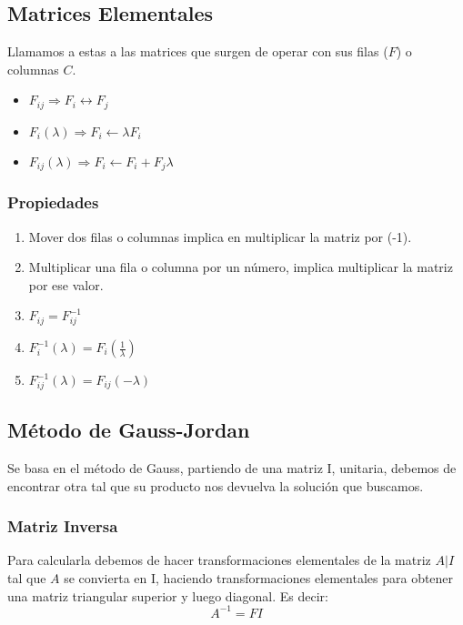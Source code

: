 \subsection{Matrices Elementales}
\noindent Llamamos a estas a las matrices que surgen de operar con sus filas (\(F\)) o columnas \(C\).
\begin{itemize}
        \item \(F_{ij} \Rightarrow   F_i \leftrightarrow F_j\)
        \item \(F_i(\lambda) \Rightarrow   F_i \leftarrow \lambda F_i\)
        \item \(F_{ij}(\lambda) \Rightarrow F_i \leftarrow F_i + F_j \lambda \)
\end{itemize}
\subsubsection{Propiedades}
\begin{enumerate}
        \item Mover dos filas o columnas implica en multiplicar la matriz por (-1).
        \item Multiplicar una fila o columna por un número, implica multiplicar la matriz por ese valor.
        \item \(F_{ij} = F^{-1}_{ij}\)
        \item \(F^{-1}_i(\lambda) = F_i(\frac{1}{\lambda})\)
        \item \(F^{-1}_{ij}(\lambda) = F_{ij}(-\lambda)\)
\end{enumerate}
\subsection{Método de Gauss-Jordan}
\noindent Se basa en el método de Gauss, partiendo de una matriz I, unitaria, debemos de encontrar otra tal que su producto nos devuelva la solución que buscamos.
\subsubsection{Matriz Inversa}
\noindent Para calcularla debemos de hacer transformaciones elementales de la matriz \(A|I\) tal que \(A\) se convierta en I, haciendo transformaciones elementales para obtener una matriz triangular superior y luego diagonal. Es decir:
\[
        A^{-1} = FI
\]
